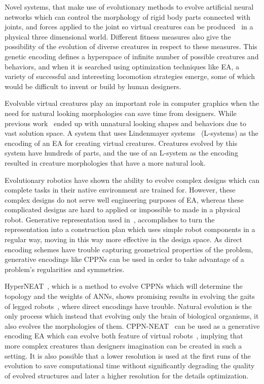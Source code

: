 Novel systems, that make use of evolutionary methods to evolve artificial neural networks which can control the morphology of rigid body parts connected with joints, and forces applied to the joint so virtual creatures can be produced~\cite{sims1994evolving} in a physical three dimensional world. Different fitness measures also give the possibility of the evolution of diverse creatures in respect to these measures. This genetic encoding defines a hyperspace of infinite number of possible creatures and behaviors, and when it is searched using optimization techniques like EA, a variety of successful and interesting locomotion strategies emerge, some of which would be difficult to invent or build by human designers.

Evolvable virtual creatures play an important role in computer graphics when the need for natural looking morphologies can save time from designers. While previous work~\cite{lipson2000automatic} ended up with unnatural looking shapes and behaviors due to vast solution space. A system that uses Lindenmayer systems~\cite{hornby2001evolving} (L-systems) as the encoding of an EA for creating virtual creatures. Creatures evolved by this system have hundreds of parts, and the use of an L-system as the encoding resulted in creature morphologies that have a more natural look.

Evolutionary robotics have shown the ability to evolve complex designs which can complete tasks in their native environment are trained for. However, these complex designs do not serve well engineering purposes of EA, whereas these complicated designs are hard to applied or impossible to made in a physical robot. Generative representation used in~\cite{hornby2003generative}, accomplishes to turn the representation into a construction plan which uses simple robot components in a regular way, moving in this way more effective in the design space. As direct encoding schemes have trouble capturing geometrical properties of the problem, generative encodings like CPPNs can be used in order to take advantage of a problem's regularities and symmetries. 

HyperNEAT~\cite{stanley2009hypercube}, which is a method to evolve CPPNs which will determine the topology and the weights of ANNs, shows promising results in evolving the gaits of legged robots~\cite{clune2009evolving}, where direct encodings have trouble. Natural evolution is the only process which instead that evolving only the brain of biological organisms, it also evolves the morphologies of them. CPPN-NEAT~\cite{stanley2007compositional} can be used as a generative encoding EA which can evolve both feature of virtual robots~\cite{auerbach2010dynamic, auerbach2010evolving}, implying that more complex creatures than designers imagination can be created in such a setting. It is also possible that a lower resolution is used at the first runs of the evolution to save computational time without significantly degrading the quality of evolved structures and later a higher resolution for the details optimization.

